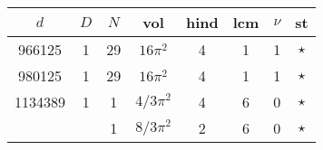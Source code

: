 \documentclass[12pt]{amsart}
\providecommand{\DIFadd}[1]{{\protect\color{blue}\uwave{#1}}} %
\providecommand{\DIFdel}[1]{{\protect\color{red}\sout{#1}}}                      %
\providecommand{\DIFaddbegin}{} %
\providecommand{\DIFaddend}{} %
\providecommand{\DIFdelbegin}{} %
\providecommand{\DIFdelend}{} %
\begin{document}
\begin{tabular}{ccc|ccccc}
$d$ & $D$ & $N$ & vol & hind & lcm & $\nu$ & st\\
\hline
966125 & 1 & 29 & $16\pi^2$ & 4 & 1 & 1 & $\star$ \\
980125 & 1 & 29 & $16\pi^2$ & 4 & 1 & 1 & $\star$ \\
1134389 & 1 & 1 & \DIFdelbegin \DIFdel{$4/3\pi^2$ }\DIFdelend \DIFaddbegin \DIFadd{$(4/3)\pi^2$ }\DIFaddend & 4 & 6 & 0 & $\star$ \\
 &  & 1 & \DIFdelbegin \DIFdel{$8/3\pi^2$ }\DIFdelend \DIFaddbegin \DIFadd{$(8/3)\pi^2$ }\DIFaddend & 2 & 6 & 0 & $\star$ \\
\end{tabular}
\end{document}
